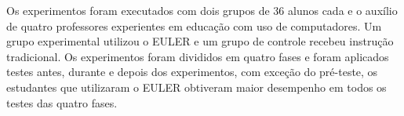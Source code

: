 Os experimentos foram executados com dois grupos de 36 alunos cada e o auxílio de quatro professores experientes em educação com uso de computadores. Um grupo experimental utilizou o EULER e um grupo de controle recebeu instrução tradicional. Os experimentos foram divididos em quatro fases e foram aplicados testes antes, durante e depois dos experimentos, com exceção do pré-teste, os estudantes que utilizaram o EULER obtiveram maior desempenho em todos os testes das quatro fases.